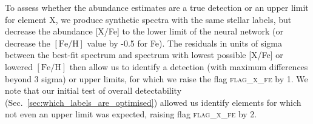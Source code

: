 \documentclass[
  journal=pasa,
  manuscript=research-paper, %
  year=2023,
  volume=37
]{cup-journal}
\newcommand{\feh}{$\mathrm{[Fe/H]}$\xspace}
\begin{document}
To assess whether the abundance estimates are a true detection or an upper limit for element X, we produce synthetic spectra with the same stellar labels, but decrease the abundance [X/Fe] to the lower limit of the neural network (or decrease the \feh value by -0.5 for Fe). The residuals in units of sigma between the best-fit spectrum and spectrum with lowest possible [X/Fe] or lowered \feh then allow us to identify a detection (with maximum differences beyond 3 sigma) or upper limits, for which we raise the flag \textsc{flag\_x\_fe} by 1. We note that our initial test of overall detectability (Sec.~\ref{sec:which_labels_are_optimised}) allowed us identify elements for which not even an upper limit was expected, raising flag \textsc{flag\_x\_fe} by 2.

\end{document}
